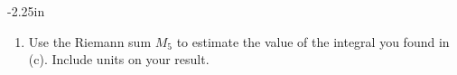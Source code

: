 \begin{adjustwidth*}{}{-2.25in}
\begin{multicols*}{2}
\begin{enumerate}[1),resume]
	\item Use the Riemann sum $M_5$ to estimate the value of the integral you found in (c).  Include units on your result.
\ea


\end{enumerate}

\end{multicols*}
\end{adjustwidth*}

\afterexercises